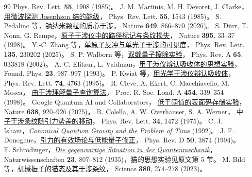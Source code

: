 \begin{thebibliography}{99}
    Phys. Rev. Lett. \textbf{55}, 1908 (1985)。
    J. M. Martinis, M. H. Devoret, J. Clarke，
    \href{https://doi.org/10.1103/PhysRevLett.55.1543}{用微波探测 Josephson 结的能级}，
    Phys. Rev. Lett. \textbf{55}, 1543 (1985)。
    S. Pedalino 等，\href{https://doi.org/10.1038/s41586-025-09917-9}{钠纳米颗粒的质心干涉}，
    Nature \textbf{649}, 866--870 (2026)。
    S. Dürr, T. Nonn, G. Rempe，\href{https://doi.org/10.1038/25653}{原子干涉仪中的路径标记与条纹损失}，
    Nature \textbf{395}, 33--37 (1998)。
    Y.-C. Zhang 等，\href{https://doi.org/10.1103/93zb-lws3}{单原子反冲与单光子干涉的可见度}，
    Phys. Rev. Lett. \textbf{135}, 230202 (2025)。
    S. P. Walborn 等，\href{https://doi.org/10.1103/PhysRevA.65.033818}{双缝量子擦除实验}，
    Phys. Rev. A \textbf{65}, 033818 (2002)。
    A. C. Elitzur, L. Vaidman，\href{https://doi.org/10.1007/BF00736012}{用干涉仪辨认吸收体的思想实验}，
    Found. Phys. \textbf{23}, 987--997 (1993)。
    P. Kwiat 等，\href{https://doi.org/10.1103/PhysRevLett.74.4763}{用光学干涉仪辨认吸收体}，
    Phys. Rev. Lett. \textbf{74}, 4763 (1995)。
    R. Cleve, A. Ekert, C. Macchiavello, M. Mosca，
    \href{https://arxiv.org/abs/quant-ph/9708016}{由干涉理解量子查询算法}，
    Proc. R. Soc. Lond. A \textbf{454}, 339--354 (1998)。
    Google Quantum AI and Collaborators，
    \href{https://doi.org/10.1038/s41586-024-08449-y}{低于阈值的表面码存储实验}，
    Nature \textbf{638}, 920--926 (2025)。
    R. Colella, A. W. Overhauser, S. A. Werner，
    \href{https://doi.org/10.1103/PhysRevLett.34.1472}{中子干涉条纹随引力势差的移动}，
    Phys. Rev. Lett. \textbf{34}, 1472 (1975)。
    C. J. Isham，\href{https://arxiv.org/abs/gr-qc/9210011}{\textit{Canonical Quantum Gravity and the Problem of Time}} (1992)。
    J. F. Donoghue，\href{https://doi.org/10.1103/PhysRevD.50.3874}{引力的有效场论与低能量子修正}，
    Phys. Rev. D \textbf{50}, 3874 (1994)。
    E. Schrödinger，\href{https://doi.org/10.1007/BF01491891}{\textit{Die gegenwärtige Situation in der Quantenmechanik}}，
    Naturwissenschaften \textbf{23}, 807--812 (1935)，猫的思想实验见原文第 5 节。
    M. Bild 等，\href{https://doi.org/10.1126/science.adf7553}{机械振子的猫态及其干涉条纹}，
    Science \textbf{380}, 274--278 (2023)。
\end{thebibliography}

